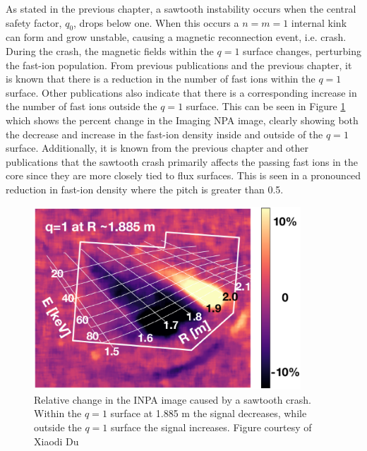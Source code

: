 As stated in the previous chapter, a sawtooth instability occurs when the central safety factor, $q_0$, drops below one. When this occurs a $n=m=1$ internal kink can form and grow unstable, causing a magnetic reconnection event, i.e. crash. During the crash, the magnetic fields within the $q=1$ surface changes, perturbing the fast-ion population. From previous publications and the previous chapter, it is known that there is a reduction in the number of fast ions within the $q=1$ surface\cite{jacobsen_stagner2016,van2010imaging,weiland2016}. Other publications also indicate that there is a corresponding increase in the number of fast ions outside the $q=1$ surface.\cite{weiland2016,du2018inpa} This can be seen in Figure \ref{fig:inpa_sawtooth}\cite{du2018inpa} which shows the percent change in the Imaging NPA image, clearly showing both the decrease and increase in the fast-ion density inside and outside of the $q=1$ surface.
Additionally, it is known from the previous chapter and other publications\cite{Muscatello2012,jacobsen_stagner2016,weiland2016} that the sawtooth crash primarily affects the passing fast ions in the core since they are more closely tied to flux surfaces. This is seen in a pronounced reduction in fast-ion density where the pitch is greater than 0.5.
\begin{figure}[h!]
    \centering
    \includegraphics[width=10cm]{figures/inpa_sawtooth.eps}
    \caption{Relative change in the INPA image caused by a sawtooth crash. Within the $q=1$ surface at 1.885 m the signal decreases, while outside the $q=1$ surface the signal increases. Figure courtesy of Xiaodi Du\cite{du2018inpa}}
    \label{fig:inpa_sawtooth}
\end{figure}

